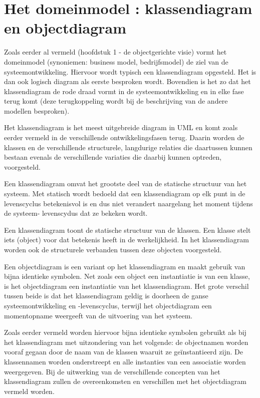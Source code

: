 \section{Het domeinmodel : klassendiagram en objectdiagram}

Zoals eerder al vermeld (hoofdstuk 1 - de objectgerichte visie) vormt het domeinmodel (synoniemen: business model, bedrijfsmodel) de ziel van de systeemontwikkeling. Hiervoor wordt typisch een klassendiagram opgesteld. Het is dan ook logisch diagram als eerste besproken wordt. Bovendien is het zo dat het klassendiagram de rode draad vormt in de systeemontwikkeling en in elke fase terug komt (deze terugkoppeling wordt bij de beschrijving van de andere modellen besproken).

Het klassendiagram is het meest uitgebreide diagram in UML en komt zoals eerder vermeld in de verschillende ontwikkelingsfasen terug. Daarin worden de klassen en de verschillende structurele, langdurige relaties die daartussen kunnen bestaan evenals de verschillende variaties die daarbij kunnen optreden, voorgesteld.

Een klassendiagram omvat het grootste deel van de statische structuur van het systeem. Met statisch wordt bedoeld dat een klassendiagram op elk punt in de levenscyclus betekenisvol is en dus niet verandert naargelang het moment tijdens de systeem- levenscydus dat ze bekeken wordt.

Een klassendiagram toont de statische structuur van de klassen. Een klasse stelt iets (object) voor dat betekenis heeft in de werkelijkheid. In het klassendiagram worden ook de structurele verbanden tussen deze objecten voorgesteld.

Een objectdiagram is een variant op het klassendiagram en maakt gebruik van bijna identieke symbolen. Net zoals een object een instantiatie is van een klasse, is het objectdiagram een instantiatie van het klassendiagram.
Het grote verschil tussen beide is dat het klassendiagram geldig is doorheen de ganse systeemontwikkeling en -levenscyclus, terwijl het objectdiagram een momentopname weergeeft van de uitvoering van het systeem.

Zoals eerder vermeld worden hiervoor bijna identieke symbolen gebruikt als bij het klassendiagram met uitzondering van het volgende: de objectnamen worden vooraf gegaan door de naam van de klassen waaruit ze geïnstantieerd zijn. De klassennamen worden onderstreept en alle instanties van een associatie worden weergegeven. Bij de uitwerking van de verschillende concepten van het klassendiagram zullen de overeenkomsten en verschillen met het objectdiagram vermeld worden.

